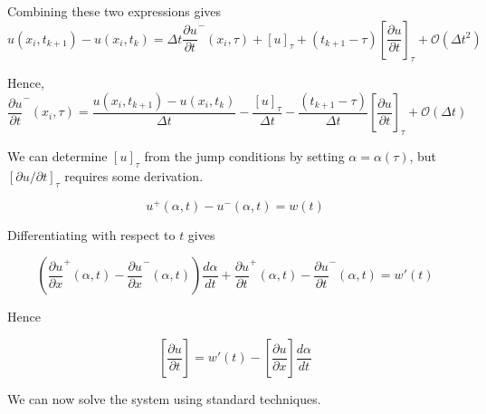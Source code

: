 Combining these two expressions gives
\begin{equation}
    u(x_i,t_{k+1}) - u(x_i,t_k) = \Delta t \frac{\partial u}{\partial t}^-(x_i,\tau) + [u]_\tau + (t_{k+1} - \tau) \left[\frac{\partial u}{\partial t}\right]_\tau + \mathcal{O}(\Delta t^2)
\end{equation}

Hence,
\begin{equation}
     \frac{\partial u}{\partial t}^-(x_i,\tau) =  \frac{u(x_i,t_{k+1}) - u(x_i,t_k)}{\Delta t} - \frac{[u]_\tau}{\Delta t} - \frac{(t_{k+1} - \tau)}{\Delta t} \left[\frac{\partial u}{\partial t}\right]_\tau + \mathcal{O}(\Delta t)
\end{equation}

We can determine $[u]_\tau$ from the jump conditions by setting $\alpha = \alpha(\tau)$, but $[\partial u / \partial t]_\tau$ requires some derivation.

\begin{equation}
    u^+(\alpha,t) - u^-(\alpha,t) = w(t)
\end{equation}

Differentiating with respect to $t$ gives

\begin{equation}
    \left(\frac{\partial u}{\partial x}^+(\alpha,t) - \frac{\partial u}{\partial x}^-(\alpha,t)\right)\frac{d \alpha}{d t} + \frac{\partial u}{\partial t}^+(\alpha,t) - \frac{\partial u}{\partial t}^-(\alpha,t) = w'(t)
\end{equation}

Hence

\begin{equation}
    \left[\frac{\partial u}{\partial t}\right] = w'(t) - \left[\frac{\partial u}{\partial x}\right] \frac{d \alpha}{d t}
\end{equation}

We can now solve the system using standard techniques.
